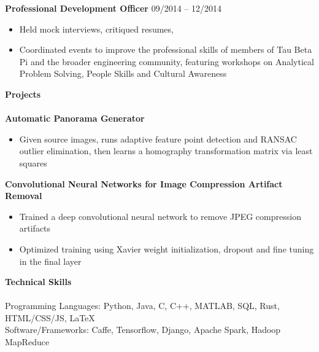 \documentclass{article}
\begin{document}
\noindent
\textbf{Professional Development Officer}
\hfill 09/2014 -- 12/2014
\begin{itemize}
\vspace{-1.8mm}
\item Held mock interviews, critiqued resumes,
\vspace{-2.5mm}
\item Coordinated events to improve the professional skills of members of Tau Beta Pi and the broader engineering community, featuring workshops on Analytical Problem Solving, People Skills and Cultural Awareness
\end{itemize}


\noindent
\textbf{\Large Projects}\\[-2mm]
\HRule\\
\textbf{Automatic Panorama Generator} 
\begin{itemize}
\vspace{-1.8mm}
\item Given source images, runs adaptive feature point detection and RANSAC outlier elimination, then learns a homography transformation matrix via least squares
\end{itemize}
\vspace{-1.8mm}
\noindent
\textbf{Convolutional Neural Networks for Image Compression Artifact Removal}
\begin{itemize}
\vspace{-1.8mm}
\item Trained a deep convolutional neural network to remove JPEG compression artifacts
\vspace{-2.5mm}
\item Optimized training using Xavier weight initialization, dropout and fine tuning in the final layer
\end{itemize}

\noindent
\textbf{\Large Technical Skills}\\[-2mm]
\HRule\\
Programming Languages: Python, Java, C, C++, MATLAB, SQL, Rust, HTML/CSS/JS, \LaTeX \\
Software/Frameworks: Caffe, Tensorflow, Django, Apache Spark, Hadoop MapReduce

\end{document}
